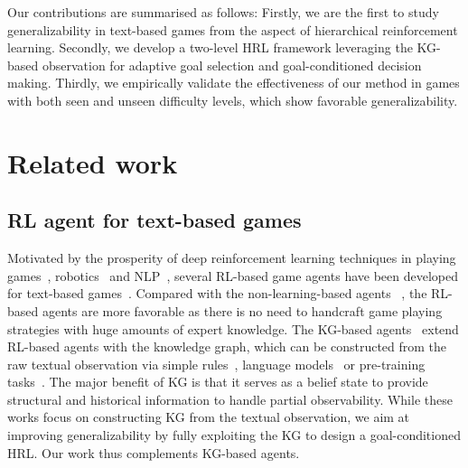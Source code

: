 \documentclass[11pt]{article}
\begin{document}
Our contributions are summarised as follows:
Firstly, we are the first to study generalizability in text-based games from the aspect of hierarchical reinforcement learning.
Secondly, we develop a two-level HRL framework leveraging the KG-based observation for adaptive goal selection and goal-conditioned decision making. 
Thirdly, we empirically validate the effectiveness of our method in games with both seen and unseen difficulty levels, which show favorable generalizability. 


\section{Related work}
\subsection{RL agent for text-based games} 
Motivated by the prosperity of deep reinforcement learning techniques in playing games~\cite{silver2016mastering}, robotics~\cite{schulman2017ppo,fang2019dher,fang2019curriculum} and NLP~\cite{fang2017learning}, several RL-based game agents have been developed for text-based games~\cite{he2016drrn,yuan2018counting,jain2019aaai,yin2019cog,guo2020emnlp,xu2020cog}. Compared with the non-learning-based agents ~\cite{hausknecht2019nail, atkinson2019text}, the RL-based agents are more favorable as there is no need to handcraft game playing strategies with huge amounts of expert knowledge. The KG-based agents~\cite{murugesan2020kg,xu2020nips} extend RL-based agents with the knowledge graph, which can be constructed from the raw textual observation via simple rules~\cite{ammanabrolu2019kgdqn}, language models~\cite{ammanabrolu2020kga2cexplore} or pre-training tasks~\cite{adhikari2020gatav2}. The major benefit of KG is that it serves as a belief state to provide structural and historical information to handle partial observability. While these works focus on constructing KG from the textual observation, we aim at improving generalizability by fully exploiting the KG to design a goal-conditioned HRL. Our work thus complements KG-based agents. 
\end{document}

